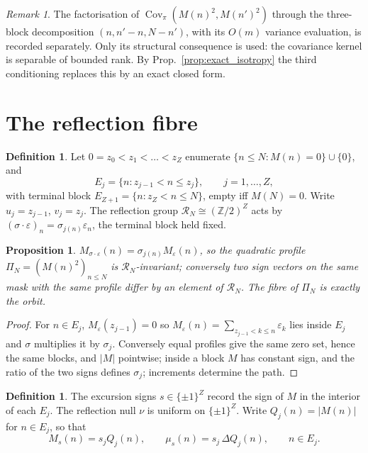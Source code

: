 \documentclass[11pt]{amsart}
\numberwithin{equation}{section}
\theoremstyle{plain}
\newtheorem{proposition}[theorem]{Proposition}
\theoremstyle{definition}
\newtheorem{definition}[theorem]{Definition}
\theoremstyle{remark}
\newtheorem{remark}[theorem]{Remark}
\DeclareMathOperator{\Cov}{Cov}
\begin{document}
\begin{remark}
\label{rem:N1_usage}
The factorisation of $\Cov_\pi(M(n)^2,M(n')^2)$ through the three-block
decomposition $(n,n'-n,N-n')$, with its $O(m)$ variance evaluation, is
recorded separately. Only its structural consequence is used: the
covariance kernel is separable of bounded rank. By
Prop.~\ref{prop:exact_isotropy} the third conditioning replaces this by
an exact closed form.
\end{remark}

\section{The reflection fibre}
\label{sec:reflection_fibre}

\begin{definition}
\label{def:excursions}
Let $0=z_0<z_1<\dots<z_Z$ enumerate $\{n\le N:M(n)=0\}\cup\{0\}$, and
\begin{equation}
E_j=\{n:z_{j-1}<n\le z_j\},\qquad j=1,\dots,Z,
\label{eq:excursion_blocks}
\end{equation}
with terminal block $E_{Z+1}=\{n:z_Z<n\le N\}$, empty iff $M(N)=0$.
Write $u_j=z_{j-1}$, $v_j=z_j$. The reflection group
$\mathcal R_N\cong(\mathbb Z/2)^Z$ acts by
$(\sigma\cdot\varepsilon)_n=\sigma_{j(n)}\varepsilon_n$, the terminal
block held fixed.
\end{definition}

\begin{proposition}
\label{prop:reflection_fibre}
$M_{\sigma\cdot\varepsilon}(n)=\sigma_{j(n)}M_\varepsilon(n)$, so the
quadratic profile $\Pi_N=(M(n)^2)_{n\le N}$ is
$\mathcal R_N$-invariant; conversely two sign vectors on the same mask
with the same profile differ by an element of $\mathcal R_N$. The fibre
of $\Pi_N$ is exactly the orbit.
\end{proposition}

\begin{proof}
For $n\in E_j$, $M_\varepsilon(z_{j-1})=0$ so
$M_\varepsilon(n)=\sum_{z_{j-1}<k\le n}\varepsilon_k$ lies inside $E_j$
and $\sigma$ multiplies it by $\sigma_j$. Conversely equal profiles give
the same zero set, hence the same blocks, and $|M|$ pointwise; inside a
block $M$ has constant sign, and the ratio of the two signs defines
$\sigma_j$; increments determine the path.
\end{proof}

\begin{definition}
\label{def:excursion_signs}
The excursion signs $s\in\{\pm1\}^Z$ record the sign of $M$ in the
interior of each $E_j$. The reflection null $\nu$ is uniform on
$\{\pm1\}^Z$. Write $Q_j(n)=|M(n)|$ for $n\in E_j$, so that
\begin{equation}
M_s(n)=s_jQ_j(n),\qquad \mu_s(n)=s_j\,\Delta Q_j(n),\qquad n\in E_j .
\label{eq:canonical_positive_path}
\end{equation}
\end{definition}
\end{document}
